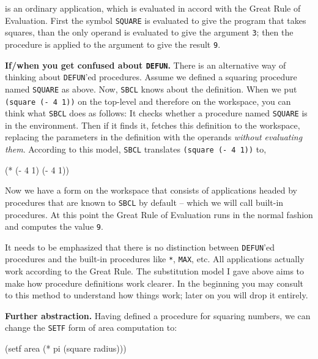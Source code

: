\documentclass[a4paper,11pt]{article}
\begin{document}
\begin{uenum}
\begin{uenumi}
is an ordinary application, which is evaluated in accord with the Great Rule of Evaluation. First the symbol \Verb+SQUARE+ is evaluated to give the program that takes squares, than the only operand is evaluated to give the argument \Verb+3+; then the procedure is applied to the argument to give the result \Verb+9+.
\end{uenumi}

\item {\bf If/when you get confused about \Verb+DEFUN+.} There is an alternative way of thinking about \Verb+DEFUN+'ed procedures. Assume we defined a squaring procedure named \Verb+SQUARE+ as above. Now, \Verb+SBCL+ knows about the definition. When we put \Verb+(square (- 4 1))+ on the top-level and therefore on the workspace, you can think what \Verb+SBCL+ does as follows: It checks whether a procedure named \Verb+SQUARE+ is in the environment. Then if it finds it, fetches this definition to the workspace, replacing the parameters in the definition with the operands \emph{without evaluating them}. According to this model, \Verb+SBCL+ translates \Verb+(square (- 4 1))+ to,

\begin{lispcode}
(* (- 4 1) (- 4 1))
\end{lispcode}

Now we have a form on the workspace that consists of applications headed by procedures that are known to \Verb+SBCL+ by default -- which we will call built-in procedures. At this point the Great Rule of Evaluation runs in the normal fashion and computes the value \Verb+9+.

\begin{uenumi}
\item It needs to be emphasized that there is no distinction between \Verb+DEFUN+'ed procedures and the built-in procedures like \Verb+*+, \Verb+MAX+, etc. All applications actually work according to the Great Rule. The substitution model I gave above aims to make how procedure definitions work clearer. In the beginning you may consult to this method to understand how things work; later on you will drop it entirely.
\end{uenumi}

\item {\bf Further abstraction.} Having defined a procedure for squaring numbers, we can change the \Verb+SETF+ form of area computation to: 

\begin{lispcode}
(setf area (* pi (square radius)))
\end{lispcode}


\end{uenum}
\end{document}
